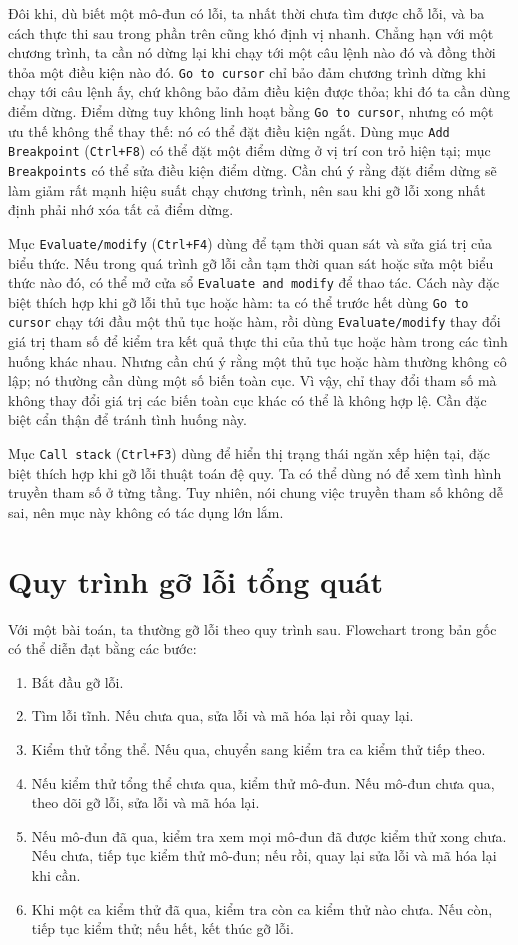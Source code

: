 \documentclass[11pt]{article}
\begin{document}
Đôi khi, dù biết một mô-đun có lỗi, ta nhất thời chưa tìm được chỗ lỗi, và ba
cách thực thi sau trong phần trên cũng khó định vị nhanh. Chẳng hạn với một
chương trình, ta cần nó dừng lại khi chạy tới một câu lệnh nào đó và đồng
thời thỏa một điều kiện nào đó. \texttt{Go to cursor} chỉ bảo đảm chương trình
dừng khi chạy tới câu lệnh ấy, chứ không bảo đảm điều kiện được thỏa; khi đó
ta cần dùng điểm dừng. Điểm dừng tuy không linh hoạt bằng \texttt{Go to
cursor}, nhưng có một ưu thế không thể thay thế: nó có thể đặt điều kiện
ngắt. Dùng mục \texttt{Add Breakpoint} (\texttt{Ctrl+F8}) có thể đặt một điểm
dừng ở vị trí con trỏ hiện tại; mục \texttt{Breakpoints} có thể sửa điều kiện
điểm dừng. Cần chú ý rằng đặt điểm dừng sẽ làm giảm rất mạnh hiệu suất chạy
chương trình, nên sau khi gỡ lỗi xong nhất định phải nhớ xóa tất cả điểm
dừng.

Mục \texttt{Evaluate/modify} (\texttt{Ctrl+F4}) dùng để tạm thời quan sát và
sửa giá trị của biểu thức. Nếu trong quá trình gỡ lỗi cần tạm thời quan sát
hoặc sửa một biểu thức nào đó, có thể mở cửa sổ \texttt{Evaluate and modify}
để thao tác. Cách này đặc biệt thích hợp khi gỡ lỗi thủ tục hoặc hàm: ta có
thể trước hết dùng \texttt{Go to cursor} chạy tới đầu một thủ tục hoặc hàm,
rồi dùng \texttt{Evaluate/modify} thay đổi giá trị tham số để kiểm tra kết quả
thực thi của thủ tục hoặc hàm trong các tình huống khác nhau. Nhưng cần chú ý
rằng một thủ tục hoặc hàm thường không cô lập; nó thường cần dùng một số biến
toàn cục. Vì vậy, chỉ thay đổi tham số mà không thay đổi giá trị các biến
toàn cục khác có thể là không hợp lệ. Cần đặc biệt cẩn thận để tránh tình
huống này.

Mục \texttt{Call stack} (\texttt{Ctrl+F3}) dùng để hiển thị trạng thái ngăn
xếp hiện tại, đặc biệt thích hợp khi gỡ lỗi thuật toán đệ quy. Ta có thể dùng
nó để xem tình hình truyền tham số ở từng tầng. Tuy nhiên, nói chung việc
truyền tham số không dễ sai, nên mục này không có tác dụng lớn lắm.

\section{Quy trình gỡ lỗi tổng quát}

Với một bài toán, ta thường gỡ lỗi theo quy trình sau. Flowchart trong bản gốc
có thể diễn đạt bằng các bước:
\begin{enumerate}
  \item Bắt đầu gỡ lỗi.
  \item Tìm lỗi tĩnh. Nếu chưa qua, sửa lỗi và mã hóa lại rồi quay lại.
  \item Kiểm thử tổng thể. Nếu qua, chuyển sang kiểm tra ca kiểm thử tiếp theo.
  \item Nếu kiểm thử tổng thể chưa qua, kiểm thử mô-đun. Nếu mô-đun chưa qua,
  theo dõi gỡ lỗi, sửa lỗi và mã hóa lại.
  \item Nếu mô-đun đã qua, kiểm tra xem mọi mô-đun đã được kiểm thử xong chưa.
  Nếu chưa, tiếp tục kiểm thử mô-đun; nếu rồi, quay lại sửa lỗi và mã hóa lại
  khi cần.
  \item Khi một ca kiểm thử đã qua, kiểm tra còn ca kiểm thử nào chưa. Nếu còn,
  tiếp tục kiểm thử; nếu hết, kết thúc gỡ lỗi.
\end{enumerate}
\end{document}
